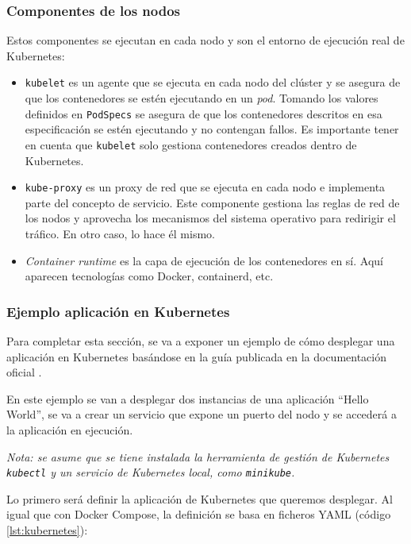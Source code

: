 \subsubsection*{Componentes de los nodos}
Estos componentes se ejecutan en cada nodo y son el entorno de ejecución real de
Kubernetes:

\begin{itemize}
    \item \texttt{kubelet} es un agente que se ejecuta en cada nodo del clúster y
          se asegura de que los contenedores se estén ejecutando en un \textit{pod}.
          Tomando los valores definidos en \texttt{PodSpecs} se asegura de que los
          contenedores descritos en esa especificación se estén ejecutando y
          no contengan fallos. Es importante tener en cuenta que \texttt{kubelet}
          solo gestiona contenedores creados dentro de Kubernetes.
    \item \texttt{kube-proxy} es un proxy de red que se ejecuta en cada nodo e
          implementa parte del concepto de servicio. Este componente gestiona las
          reglas de red de los nodos y aprovecha los mecanismos del sistema operativo
          para redirigir el tráfico. En otro caso, lo hace él mismo.
    \item \textit{Container runtime} es la capa de ejecución de los contenedores en
          sí. Aquí aparecen tecnologías como Docker, containerd, etc.
\end{itemize}

\subsubsection*{Ejemplo aplicación en Kubernetes}
Para completar esta sección, se va a exponer un ejemplo de cómo desplegar una
aplicación en Kubernetes basándose en la guía publicada en la documentación
oficial \autocite{UseServiceAccess}.

En este ejemplo se van a desplegar dos instancias de una aplicación ``Hello World'',
se va a crear un servicio que expone un puerto del nodo y se accederá a la
aplicación en ejecución.

\textit{Nota: se asume que se tiene instalada la herramienta de gestión de Kubernetes
\texttt{kubectl} y un servicio de Kubernetes local, como \texttt{minikube}.}

Lo primero será definir la aplicación de Kubernetes que queremos desplegar. Al
igual que con Docker Compose, la definición se basa en ficheros YAML (código \ref{lst:kubernetes}):

